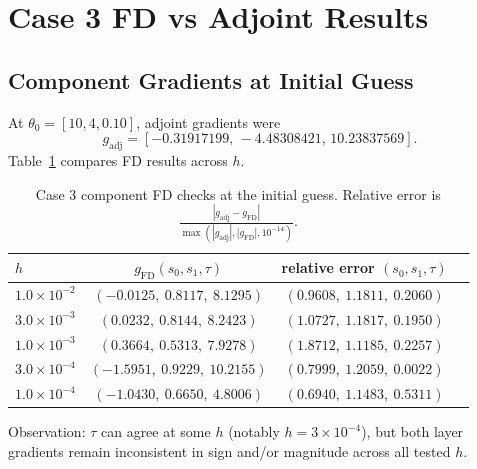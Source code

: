 \documentclass[11pt]{article}
\begin{document}
\section{Case 3 FD vs Adjoint Results}
\subsection{Component Gradients at Initial Guess}
At \(\theta_0=[10,4,0.10]\), adjoint gradients were
\[
g_{\text{adj}}=[-0.31917199,\,-4.48308421,\,10.23837569].
\]
Table~\ref{tab:hsweep} compares FD results across \(h\).

\begin{table}[h!]
\centering
\caption{Case 3 component FD checks at the initial guess. Relative error is
\(\frac{|g_{\mathrm{adj}}-g_{\mathrm{FD}}|}{\max(|g_{\mathrm{adj}}|,|g_{\mathrm{FD}}|,10^{-14})}\).}
\label{tab:hsweep}
\begin{tabular}{@{}lccc@{}}
\toprule
\(h\) & \(g_{\mathrm{FD}}(s_0,s_1,\tau)\) & relative error \((s_0,s_1,\tau)\) \\
\midrule
\(1.0\times10^{-2}\) & \((-0.0125,\ 0.8117,\ 8.1295)\) & \((0.9608,\ 1.1811,\ 0.2060)\) \\
\(3.0\times10^{-3}\) & \((0.0232,\ 0.8144,\ 8.2423)\) & \((1.0727,\ 1.1817,\ 0.1950)\) \\
\(1.0\times10^{-3}\) & \((0.3664,\ 0.5313,\ 7.9278)\) & \((1.8712,\ 1.1185,\ 0.2257)\) \\
\(3.0\times10^{-4}\) & \((-1.5951,\ 0.9229,\ 10.2155)\) & \((0.7999,\ 1.2059,\ 0.0022)\) \\
\(1.0\times10^{-4}\) & \((-1.0430,\ 0.6650,\ 4.8006)\) & \((0.6940,\ 1.1483,\ 0.5311)\) \\
\bottomrule
\end{tabular}
\end{table}

Observation: \(\tau\) can agree at some \(h\) (notably \(h=3\times10^{-4}\)), but both layer gradients remain inconsistent in sign and/or magnitude across all tested \(h\).
\end{document}

